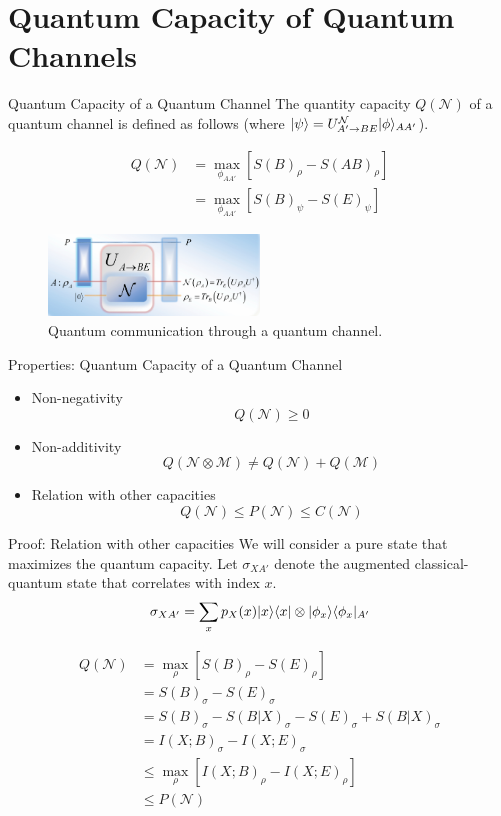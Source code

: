 \section{Quantum Capacity of Quantum Channels}

\begin{frame}{Quantum Capacity of a Quantum Channel}
The quantity capacity $Q(\mathcal{N})$ of a quantum channel is defined as follows (where $\lvert\psi\rangle = U^{\mathcal{N}}_{A' \rightarrow BE} \lvert\phi\rangle_{AA'}$).
\begin{tcolorbox}
\begin{align*}
Q(\mathcal{N}) &= \max_{\phi_{AA'}} \left[ S(B)_\rho - S(AB)_\rho \right] \\
&= \max_{\phi_{AA'}} \left[ S(B)_\psi - S(E)_\psi \right]
\end{align*}
\end{tcolorbox}

\begin{figure}
    \includegraphics[width=0.5\textwidth]{figures/quantum_communication_quantum_channel.png}
    \caption{Quantum communication through a quantum channel.}
\end{figure}
\end{frame}

\begin{frame}{Properties: Quantum Capacity of a Quantum Channel}
\begin{itemize}
    \setlength{\itemsep}{1.5em}
    \item Non-negativity
    $$Q(\mathcal{N}) \geq 0$$
    \item Non-additivity
    $$Q(\mathcal{N} \otimes \mathcal{M}) \neq Q(\mathcal{N}) + Q(\mathcal{M})$$
    \item Relation with other capacities
    $$Q(\mathcal{N}) \leq P(\mathcal{N}) \leq C(\mathcal{N})$$
\end{itemize}
\end{frame}

\begin{frame}{Proof: Relation with other capacities}
We will consider a pure state that maximizes the quantum capacity. Let $\sigma_{XA'}$ denote the augmented classical-quantum state that correlates with index $x$.
$$\sigma_{XA'} = \sum_{x} p_X(x) \lvert x\rangle\langle x\rvert \otimes \lvert\phi_x\rangle\langle\phi_x\rvert_{A'}$$

\begin{align*}
Q(\mathcal{N}) &= \max_{\rho} \left[ S(B)_{\rho} - S(E)_{\rho} \right] \\
&= S(B)_{\sigma} - S(E)_{\sigma}\\
&= S(B)_{\sigma} - S(B|X)_{\sigma} - S(E)_{\sigma} + S(B|X)_{\sigma}\\
&= I(X;B)_{\sigma} - I(X;E)_{\sigma} \\
&\leq \max_{\rho} \left[ I(X;B)_{\rho} - I(X;E)_{\rho} \right] \\
&\leq P(\mathcal{N})
\end{align*}
\end{frame}
